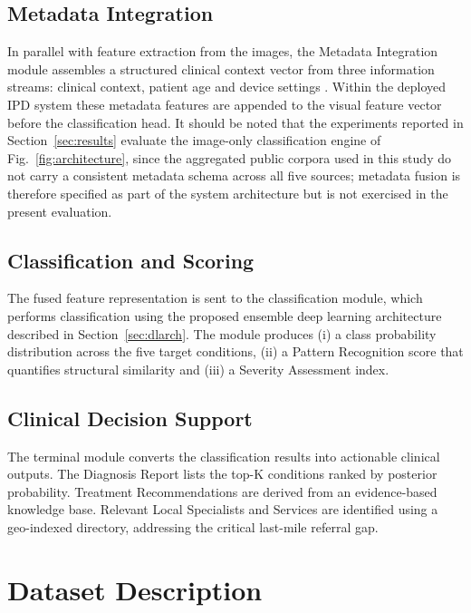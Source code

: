 \documentclass[pdflatex,sn-mathphys-num]{sn-jnl}%
\begin{document}
\subsection{Metadata Integration}

In parallel with feature extraction from the images, the Metadata Integration module
assembles a structured clinical context vector from three information streams: clinical
context, patient age and device settings \cite{ref7}. Within the deployed IPD system these
metadata features are appended to the visual feature vector before the classification head.
It should be noted that the experiments reported in Section~\ref{sec:results} evaluate the
image-only classification engine of Fig.~\ref{fig:architecture}, since the aggregated public
corpora used in this study do not carry a consistent metadata schema across all five sources;
metadata fusion is therefore specified as part of the system architecture but is not
exercised in the present evaluation.

\subsection{Classification and Scoring}

The fused feature representation is sent to the classification module, which performs
classification using the proposed ensemble deep learning architecture described in
Section~\ref{sec:dlarch}. The module produces (i) a class probability distribution across the
five target conditions, (ii) a Pattern Recognition score that quantifies structural
similarity and (iii) a Severity Assessment index.

\subsection{Clinical Decision Support}

The terminal module converts the classification results into actionable clinical outputs. The
Diagnosis Report lists the top-K conditions ranked by posterior probability. Treatment
Recommendations are derived from an evidence-based knowledge base. Relevant Local Specialists
and Services are identified using a geo-indexed directory, addressing the critical last-mile
referral gap.

\section{Dataset Description}\label{sec:dataset}
\end{document}
